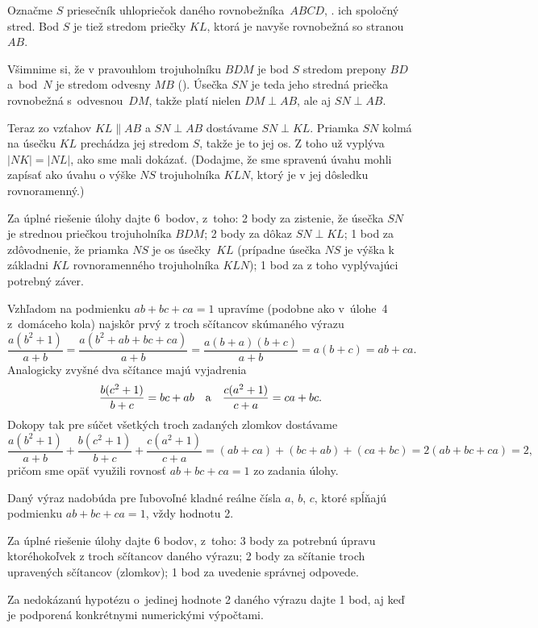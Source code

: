 {%
Označme $S$ priesečník uhlopriečok daného
rovnobežníka~$ABCD$, \tj. ich spoločný stred.
Bod $S$ je tiež stredom priečky $KL$,
ktorá je navyše rovnobežná so stranou~$AB$.

Všimnime si, že v pravouhlom trojuholníku $BDM$ je bod $S$ stredom
prepony $BD$ a~bod~$N$ je stredom odvesny $MB$ (\obr).
Úsečka $SN$ je teda jeho stredná priečka rovnobežná
s~odvesnou~$DM$, takže platí nielen $DM\perp AB$, ale aj $SN\perp AB$.
%

Teraz zo vzťahov $KL\parallel AB$ a $SN\perp AB$ dostávame $SN\perp KL$.
Priamka $SN$ kolmá na úsečku $KL$ prechádza jej stredom $S$, takže je to jej os. Z toho už vyplýva $|NK|=|NL|$, ako sme mali dokázať.
(Dodajme, že sme spravenú úvahu mohli zapísať ako úvahu o výške $NS$ trojuholníka $KLN$, ktorý je v jej dôsledku rovnoramenný.)


\schemaABC
Za úplné riešenie úlohy dajte 6~bodov, z~toho: 2 body za
zistenie, že úsečka $SN$ je strednou priečkou trojuholníka $BDM$;
2 body za dôkaz $SN\perp KL$; 1 bod za zdôvodnenie, že priamka $NS$ je os úsečky~$KL$ (prípadne úsečka $NS$ je výška k základni $KL$ rovnoramenného trojuholníka $KLN$); 1 bod za z toho
vyplývajúci potrebný záver.
\endschema
}

{%
Vzhľadom na podmienku $ab+bc+ca=1$ upravíme (podobne
ako v~úlohe~4 z~domáceho kola) najskôr prvý z troch sčítancov skúmaného výrazu
$$
\frac{a(b^2+1)}{a+b}=\frac{a(b^2+ab+bc+ca)}{a+b}=
\frac{a(b+a)(b+c)}{a+b}=a(b+c)=ab+ca.
$$
Analogicky zvyšné dva sčítance majú vyjadrenia
$$
\frac{b(c^2+1)}{b+c}=bc+ab \quad \hbox{a}\quad
\frac{c(a^2+1)}{c+a}=ca+bc.
$$
Dokopy tak pre súčet všetkých troch zadaných zlomkov dostávame
$$
\frac{a(b^2+1)}{a+b}+\frac{b(c^2+1)}{b+c}+\frac{c(a^2+1)}{c+a}=
(ab+ca)+(bc+ab)+(ca+bc)=2(ab+bc+ca)=2,
$$
pričom sme opäť využili rovnosť $ab+bc+ca=1$ zo zadania úlohy.

\Zav
Daný výraz nadobúda pre ľubovoľné kladné reálne čísla
$a$, $b$, $c$, ktoré spĺňajú podmienku $ab+bc+ca=1$,
vždy hodnotu 2.

\schemaABC
Za úplné riešenie úlohy dajte 6 bodov, z~toho: 3
body za potrebnú úpravu ktoréhokoľvek z troch sčítancov daného výrazu;
2 body za sčítanie troch upravených sčítancov (zlomkov); 1 bod
za uvedenie správnej odpovede.

Za nedokázanú hypotézu o~jedinej hodnote 2 daného výrazu dajte 1
bod, aj keď je podporená konkrétnymi numerickými výpočtami.
\endschema
}

